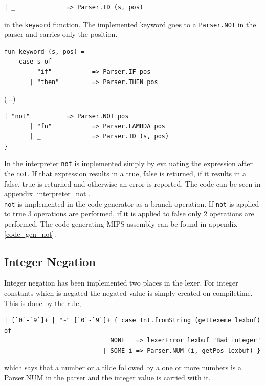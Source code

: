\documentclass[11pt]{article}
\begin{document}
    \begin{lstlisting}[firstnumber=55]
| _              => Parser.ID (s, pos)
    \end{lstlisting}

    in the \texttt{keyword} function.  The implemented keyword goes to a
    \texttt{Parser.NOT} in the parser and carries only the position.

    \begin{lstlisting}[firstnumber=29]
fun keyword (s, pos) =
    case s of
         "if"           => Parser.IF pos
       | "then"         => Parser.THEN pos
\end{lstlisting}
       (...)
\begin{lstlisting}[firstnumber=53]
       | "not"          => Parser.NOT pos
       | "fn"           => Parser.LAMBDA pos
       | _              => Parser.ID (s, pos)
}
    \end{lstlisting}

    In the interpreter \texttt{not} is implemented simply by evaluating the
    expression after the \texttt{not}.  If that expression results in a true,
    false is returned, if it results in a false, true is returned and otherwise
    an error is reported.  The code can be seen in appendix
    \ref{interpreter_not}. \\

    \texttt{not} is implemented in the code generator as a branch operation.  If
    \texttt{not} is applied to true 3 operations are performed, if it is applied
    to false only 2 operations are performed.  The code generating MIPS assembly
    can be found in appendix \ref{code_gen_not}.

    \subsection{Integer Negation}
    Integer negation has been implemented two places in the lexer.  For integer
    constants which is negated the negated value is simply created on
    compiletime.  This is done by the rule,

    \begin{lstlisting}[firstnumber=66]
| [`0`-`9`]+ | "~" [`0`-`9`]+ { case Int.fromString (getLexeme lexbuf) of
                             NONE   => lexerError lexbuf "Bad integer"
                           | SOME i => Parser.NUM (i, getPos lexbuf) }
    \end{lstlisting}

    which says that a number or a tilde followed by a one or more numbers is a
    Parser.NUM in the parser and the integer value is carried with it. \\
\end{document}
